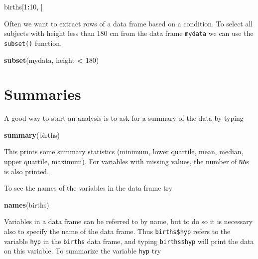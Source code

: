 \documentclass[
]{book}
\newenvironment{Shaded}{\begin{snugshade}}{\end{snugshade}}
\newcommand{\DecValTok}[1]{\textcolor[rgb]{0.00,0.00,0.81}{#1}}
\newcommand{\FunctionTok}[1]{\textcolor[rgb]{0.13,0.29,0.53}{\textbf{#1}}}
\newcommand{\NormalTok}[1]{#1}
\newcommand{\SpecialCharTok}[1]{\textcolor[rgb]{0.81,0.36,0.00}{\textbf{#1}}}
\begin{document}
\begin{Shaded}
\begin{Highlighting}[]
\NormalTok{births[}\DecValTok{1}\SpecialCharTok{:}\DecValTok{10}\NormalTok{, ]}
\end{Highlighting}
\end{Shaded}

Often we want to extract rows of a data frame based on a condition.
To select all subjects with height less than 180 cm from the
data frame \texttt{mydata} we can use the \texttt{subset()} function.

\begin{Shaded}
\begin{Highlighting}[]
\FunctionTok{subset}\NormalTok{(mydata, height }\SpecialCharTok{\textless{}} \DecValTok{180}\NormalTok{)}
\end{Highlighting}
\end{Shaded}

\section{Summaries}\label{summaries}

A good way to start an analysis is to ask for a
summary of the data by typing

\begin{Shaded}
\begin{Highlighting}[]
\FunctionTok{summary}\NormalTok{(births)}
\end{Highlighting}
\end{Shaded}

This prints some summary statistics (minimum, lower quartile, mean, median,
upper quartile, maximum). For variables with missing values, the number
of \texttt{NA}s is also printed.

To see the names of the variables in the data frame try

\begin{Shaded}
\begin{Highlighting}[]
\FunctionTok{names}\NormalTok{(births)}
\end{Highlighting}
\end{Shaded}

Variables in a data frame can be referred to by name, but to do so
it is necessary also to specify the name of the data frame. Thus
\texttt{births\$hyp} refers to the variable \texttt{hyp} in the \texttt{births}
data frame, and typing \texttt{births\$hyp} will print the data on this
variable. To summarize the variable \texttt{hyp} try
\end{document}
